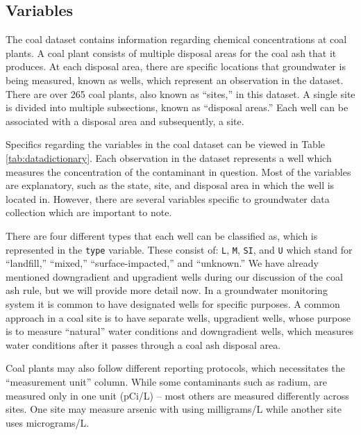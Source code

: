 \documentclass[12pt, twoside]{amherstthesis}
\begin{document}
\hypertarget{variables}{%
\subsection{Variables}\label{variables}}

The coal dataset contains information regarding chemical concentrations at coal plants. A coal plant consists of multiple disposal areas for the coal ash that it produces. At each disposal area, there are specific locations that groundwater is being measured, known as wells, which represent an observation in the dataset. There are over 265 coal plants, also known as ``sites,'' in this dataset. A single site is divided into multiple subsections, known as ``disposal areas.'' Each well can be associated with a disposal area and subsequently, a site.

Specifics regarding the variables in the coal dataset can be viewed in Table \ref{tab:datadictionary}. Each observation in the dataset represents a well which measures the concentration of the contaminant in question. Most of the variables are explanatory, such as the state, site, and disposal area in which the well is located in. However, there are several variables specific to groundwater data collection which are important to note.

There are four different types that each well can be classified as, which is represented in the \texttt{type} variable. These consist of: \texttt{L}, \texttt{M}, \texttt{SI}, and \texttt{U} which stand for ``landfill,'' ``mixed,'' ``surface-impacted,'' and ``unknown.'' We have already mentioned downgradient and upgradient wells during our discussion of the coal ash rule, but we will provide more detail now. In a groundwater monitoring system it is common to have designated wells for specific purposes. A common approach in a coal site is to have separate wells, upgradient wells, whose purpose is to measure ``natural'' water conditions and downgradient wells, which measures water conditions after it passes through a coal ash disposal area.

Coal plants may also follow different reporting protocols, which necessitates the ``measurement unit'' column. While some contaminants such as radium, are measured only in one unit (pCi/L) -- most others are measured differently across sites. One site may measure arsenic with using milligrams/L while another site uses micrograms/L.
\end{document}
